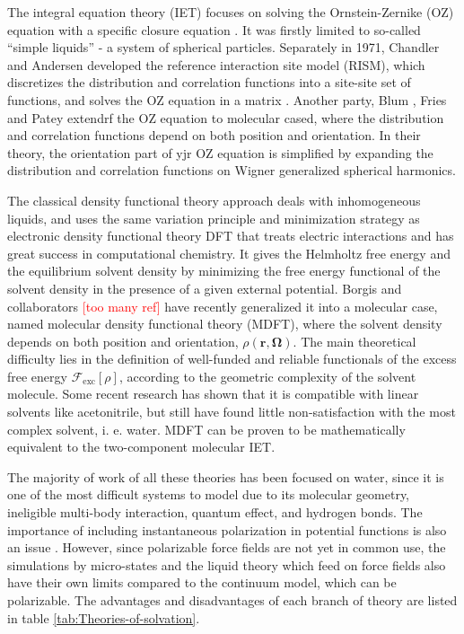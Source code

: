 The integral equation theory (\acs{IET}) focuses on solving the Ornstein-Zernike
(\acs{OZ}) equation with a specific closure equation \citep{Hensen-McDonald,Gray-Gubbins}.
It was firstly limited to so-called ``simple liquids'' - a system
of spherical particles. Separately in 1971, Chandler and Andersen \citep{Chandler_1972_RISM}
developed the reference interaction site model (\acs{RISM}), which
discretizes the distribution and correlation functions into a site-site
set of functions, and solves the \acs{OZ} equation in a matrix \citep{hirata_molecular_2004}.
Another party, Blum \citep{Blum_I,Blum_II}, Fries and Patey \citep{Fries_Patey_1985}
extendrf the \acs{OZ} equation to molecular cased, where the distribution
and correlation functions depend on both position and orientation.
In their theory, the orientation part of yjr \acs{OZ} equation is simplified
by expanding the distribution and correlation functions on Wigner
generalized spherical harmonics.

The classical density functional theory approach deals with inhomogeneous
liquids, and uses the same variation principle and minimization
strategy \citep{mermin_thermal_1965,Evans_1979,Hansen_1987} as electronic
density functional theory \acs{DFT} that treats electric interactions
and has great success in computational chemistry. It gives the Helmholtz
free energy and the equilibrium solvent density by minimizing the
free energy functional of the solvent density in the presence of a
given external potential. Borgis and collaborators \textcolor{red}{{[}too
many ref{]}} have recently generalized it into a molecular case, named
molecular density functional theory (\acs{MDFT}), where the solvent
density depends on both position and orientation, $\rho(\mathbf{r},\mathbf{\Omega})$.
The main theoretical difficulty lies in the definition of well-funded
and reliable functionals of the excess free energy $\mathcal{F}_{\mathrm{exc}}\left[\rho\right]$,
according to the geometric complexity of the solvent molecule. Some
recent research has shown that it is compatible with linear solvents
like acetonitrile, but still have found little non-satisfaction with the
most complex solvent, i. e. water. \acs{MDFT} can be proven to be
mathematically equivalent to the two-component molecular \acs{IET}.

The majority of work of all these theories has been focused on water,
since it is one of the most difficult systems to model due to its
molecular geometry, ineligible multi-body interaction, quantum effect,
and hydrogen bonds. The importance of including instantaneous polarization
in potential functions is also an issue \citep{polarisable_1,polarisable_2}.
However, since polarizable force fields are not yet in common use,
the simulations by micro-states and the liquid theory which feed on
force fields also have their own limits compared to the continuum model,
which can be polarizable. The advantages and disadvantages of each
branch of theory are listed in table \ref{tab:Theories-of-solvation}.

